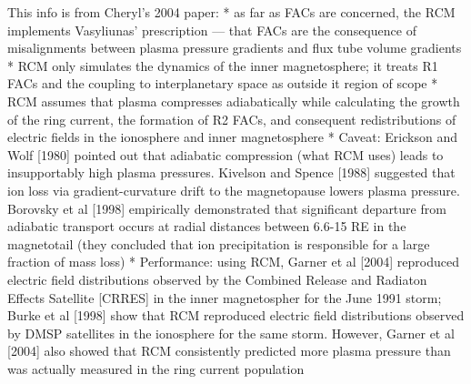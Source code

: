 
This info is from Cheryl's 2004 paper:
* as far as FACs are concerned, the RCM implements Vasyliunas'
prescription --- that FACs are the consequence of misalignments between
plasma pressure gradients and flux tube volume gradients
* RCM only simulates the dynamics of the inner magnetosphere; it treats
R1 FACs and the coupling to interplanetary space as outside it region of
scope 
* RCM assumes that plasma compresses adiabatically while calculating the
growth of the ring current, the formation of R2 FACs, and consequent
redistributions of electric fields in the ionosphere and inner
magnetosphere
* Caveat: Erickson and Wolf [1980] pointed out that adiabatic
compression (what RCM uses) leads to insupportably high plasma pressures. 
Kivelson and Spence [1988] suggested that ion loss via gradient-curvature 
drift to the magnetopause lowers plasma pressure. Borovsky et al [1998]
empirically demonstrated that significant departure from adiabatic
transport occurs at radial distances between 6.6-15 RE in the
magnetotail (they concluded that ion precipitation is responsible for a
large fraction of mass loss)
* Performance: using RCM,  Garner et al [2004] reproduced electric field
distributions observed by the Combined Release and Radiaton Effects
Satellite [CRRES] in the inner magnetospher for the June 1991 storm;
Burke et al [1998] show that RCM reproduced electric field distributions 
observed by DMSP satellites in the ionosphere for the same storm.
However, Garner et al [2004] also showed that RCM consistently predicted
more plasma pressure than was actually measured in the ring current
population 

